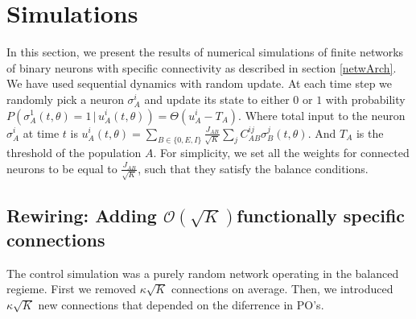 \section{\label{sec:simulations}Simulations}
In this section, we present the results of numerical simulations of finite networks of binary neurons with specific connectivity as described in section \ref{netwArch}. We have used sequential dynamics with random update. At each time step we randomly pick a neuron $\sigma_A^i$ and update its state to either $0$ or $1$ with probability $P \left(\sigma_A^1(t, \theta) = 1 \,|\, u_A^i(t, \theta) \right) = \Theta(u_A^i - T_A)$. Where total input to the neuron $\sigma_A^i$ at time $t$ is $u_A^i(t, \theta) = \sum_{B \in \lbrace 0, E, I \rbrace} \frac{J_{AB}}{\sqrt{K}} \sum_{j} C_{AB}^{ij} \sigma_B^j(t, \theta)$. And  $T_A$ is the threshold of the population $A$\@. For simplicity, we set all the weights for connected neurons to be equal to $\frac{J_{AB}}{\sqrt{K}}$, such that they satisfy the balance conditions\@.
\subsection{Rewiring: Adding $\mathcal{O} (\sqrt{K})$functionally specific connections}
The control simulation was a purely random network operating in the balanced regieme. First we removed $\kappa \sqrt{K}$ connections on average. Then, we introduced $\kappa \sqrt{K}$ new connections that depended on the diferrence in PO's. \\


